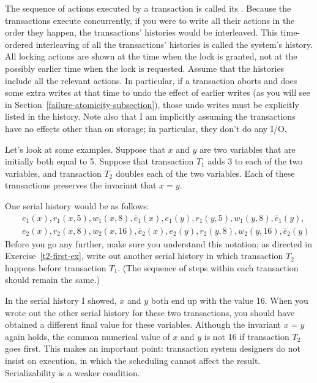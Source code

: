 The sequence of actions executed by a transaction is called its
.
Because the transactions execute concurrently, if you were to write
all their actions in the order they happen, the transactions'
histories would be interleaved.
This time-ordered interleaving of all the
transactions' histories is called the system's history.  All locking actions
are shown at the time when the lock is granted, not at the possibly
earlier time when the lock is requested.  Assume that the histories
include all the relevant actions.  In particular, if a transaction
aborts and does some extra writes at that time to undo the effect of
earlier writes (as you will see in Section~\ref{failure-atomicity-subsection}),
those undo writes must be explicitly listed in the history.  Note
also that I am implicitly assuming the transactions have no effects
other than on storage; in particular, they don't do any I/O.

Let's look at some examples.  Suppose that $x$ and $y$ are two
variables that are initially both equal to 5.
Suppose that transaction $T_1$ adds 3 to each of the two
variables, and transaction $T_2$ doubles each of the two variables.
Each of these transactions preserves the invariant that
$x=y$.

One serial history would be as follows:
\begin{eqnarray*}
&&e_1(x), r_1(x, 5), w_1(x, 8), \overline{e}_1(x),
  e_1(y), r_1(y, 5), w_1(y, 8), \overline{e}_1(y),\\
&&e_2(x), r_2(x, 8), w_2(x, 16), \overline{e}_2(x),
  e_2(y), r_2(y, 8), w_2(y, 16), \overline{e}_2(y)
\end{eqnarray*}
Before you go any further, make sure you understand this notation; as directed in
Exercise~\ref{t2-first-ex}, write out another serial history in which transaction
$T_2$ happens before transaction $T_1$.  (The sequence of steps within each
transaction should remain the same.)

In the serial history I showed, $x$ and $y$ both end up with the value
16.  When you wrote out the other serial history for these two transactions,
you should have obtained a different final value for these variables.  Although
the invariant $x=y$ again holds, the common numerical value of $x$ and
$y$ is not 16 if transaction $T_2$ goes first.  This makes an important
point: transaction system designers do not insist on  execution,
in which the scheduling cannot affect the result.  Serializability is a
weaker condition.

